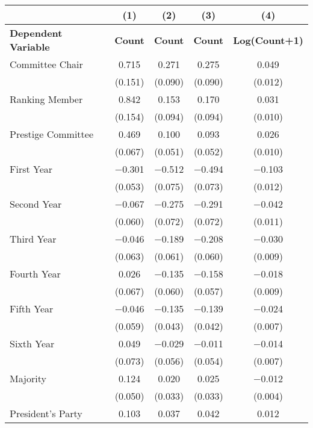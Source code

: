 \begin{tabular}[t]{lcccc}
\toprule
  & (1) & (2) & (3) & (4)\\
\midrule
\textbf{Dependent Variable} & \textbf{Count} & \textbf{Count} & \textbf{Count} & \textbf{Log(Count+1)}\\
\midrule
Committee Chair & \num{0.715} & \num{0.271} & \num{0.275} & \num{0.049}\\
 & (\num{0.151}) & (\num{0.090}) & (\num{0.090}) & (\num{0.012})\\
Ranking Member & \num{0.842} & \num{0.153} & \num{0.170} & \num{0.031}\\
 & (\num{0.154}) & (\num{0.094}) & (\num{0.094}) & (\num{0.010})\\
Prestige Committee & \num{0.469} & \num{0.100} & \num{0.093} & \num{0.026}\\
 & (\num{0.067}) & (\num{0.051}) & (\num{0.052}) & (\num{0.010})\\
First Year & \num{-0.301} & \num{-0.512} & \num{-0.494} & \num{-0.103}\\
 & (\num{0.053}) & (\num{0.075}) & (\num{0.073}) & (\num{0.012})\\
Second Year & \num{-0.067} & \num{-0.275} & \num{-0.291} & \num{-0.042}\\
 & (\num{0.060}) & (\num{0.072}) & (\num{0.072}) & (\num{0.011})\\
Third Year & \num{-0.046} & \num{-0.189} & \num{-0.208} & \num{-0.030}\\
 & (\num{0.063}) & (\num{0.061}) & (\num{0.060}) & (\num{0.009})\\
Fourth Year & \num{0.026} & \num{-0.135} & \num{-0.158} & \num{-0.018}\\
 & (\num{0.067}) & (\num{0.060}) & (\num{0.057}) & (\num{0.009})\\
Fifth Year & \num{-0.046} & \num{-0.135} & \num{-0.139} & \num{-0.024}\\
 & (\num{0.059}) & (\num{0.043}) & (\num{0.042}) & (\num{0.007})\\
Sixth Year & \num{0.049} & \num{-0.029} & \num{-0.011} & \num{-0.014}\\
 & (\num{0.073}) & (\num{0.056}) & (\num{0.054}) & (\num{0.007})\\
Majority & \num{0.124} & \num{0.020} & \num{0.025} & \num{-0.012}\\
 & (\num{0.050}) & (\num{0.033}) & (\num{0.033}) & (\num{0.004})\\
President's Party & \num{0.103} & \num{0.037} & \num{0.042} & \num{0.012}\\

\end{tabular}
